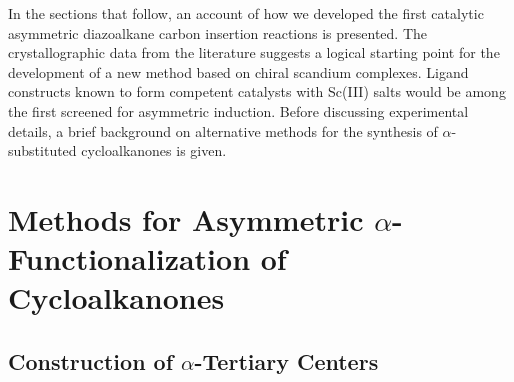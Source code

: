   In the sections that follow, an account of how we developed the first catalytic asymmetric
  diazoalkane carbon insertion reactions is presented. The crystallographic data from the literature
  suggests a logical starting point for the development of a new method based on chiral scandium complexes. Ligand constructs
 known to form competent catalysts with Sc(III) salts would be among the first screened for
 asymmetric induction. Before discussing
  experimental details, a brief background on alternative methods for the synthesis of
  $\alpha$-substituted cycloalkanones is given. 
 
 \pagebreak
 \section{Methods for Asymmetric $\alpha$-Functionalization of
 Cycloalkanones}
 
 \subsection{Construction of $\alpha$-Tertiary Centers}
 
